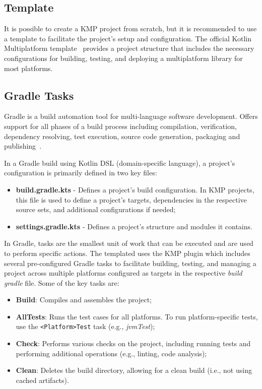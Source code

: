 \subsection{Template}\label{subsec:template}

It is possible to create a KMP project from scratch, but it is recommended to use a template to facilitate the project's setup and configuration.
The official Kotlin Multiplatform template~\cite{kmp-github-template} provides a project structure
that includes the necessary configurations for building,
testing,
and deploying a multiplatform library for most platforms.

\subsection{Gradle Tasks}\label{subsec:available-gradle-tasks}

Gradle is a build automation tool for multi-language software development.
Offers support for all phases of a build process including compilation, verification, dependency resolving, test execution, source code generation, packaging and publishing~\cite{gradle}.

In a Gradle build using Kotlin DSL (domain-specific language), a project's configuration is primarily defined in two key files:

\begin{itemize}
    \item \textbf{build.gradle.kts} - Defines a project's build configuration.
    In KMP projects, this file is used to define a project's targets, dependencies in the respective source sets, and additional configurations if needed;
    \item \textbf{settings.gradle.kts} - Defines a project's structure and modules it contains.
\end{itemize}

In Gradle, tasks are the smallest unit of work that can be executed and are used to perform specific actions.
The templated uses the KMP plugin which includes several pre-configured Gradle tasks to facilitate building, testing,
and managing a project across multiple platforms configured as targets in the respective \textit{build gradle} file.
Some of the key tasks are:

\begin{itemize}
    \item \textbf{Build}: Compiles and assembles the project;
    \item \textbf{AllTests}: Runs the test cases for all platforms.
    To run platform-specific tests, use the \texttt{<Platform>Test} task (e.g., \textit{jvmTest});
    \item \textbf{Check}: Performs various checks on the project, including running tests and performing additional operations (e.g., linting, code analysis);
    \item \textbf{Clean}: Deletes the build directory, allowing for a clean build (i.e., not using cached artifacts).
\end{itemize}


